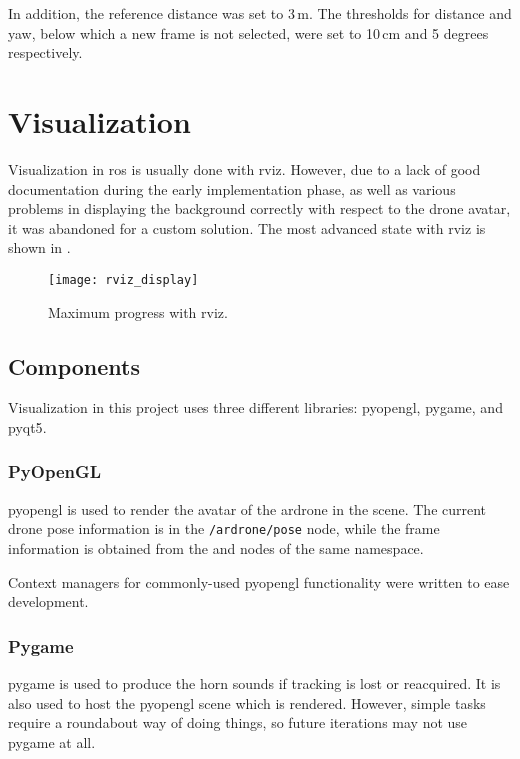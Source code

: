       In addition, the reference distance was set to 3\,m.
      The thresholds for distance and yaw, below which a new frame is not selected, were set to 10\,cm and 5 degrees respectively.

\chapter{Visualization}
  Visualization in \gls{ros} is usually done with \gls{rviz}.
  However, due to a lack of good documentation during the early implementation phase, as well as various problems in displaying the background correctly with respect to the drone avatar, it was abandoned for a custom solution.
  The most advanced state with \gls{rviz} is shown in .

  \begin{figure}[h]
    \centering
    \texttt{[image: rviz\_display]}
    \caption[rviz maximum progress]{Maximum progress with \gls{rviz}.}
    \label{fig:rviz_display}
  \end{figure}

  \section{Components}
    Visualization in this project uses three different libraries: \gls{pyopengl}, \gls{pygame}, and \gls{pyqt5}.

    \subsection{PyOpenGL}
    \gls{pyopengl} is used to render the avatar of the \gls{ardrone} in the scene.
    The current drone pose information is in the \texttt{/ardrone/pose} node, while the frame information is obtained from the \texttt{} and \texttt{} nodes of the same namespace.

    Context managers for commonly-used \gls{pyopengl} functionality were written to ease development.
    
    \subsection{Pygame}
    \gls{pygame} is used to produce the horn sounds if tracking is lost or reacquired.
    It is also used to host the \gls{pyopengl} scene which is rendered.
    However, simple tasks require a roundabout way of doing things, so future iterations may not use \gls{pygame} at all.


